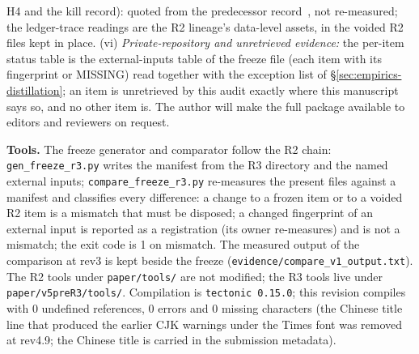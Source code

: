 \documentclass[11pt,a4paper]{article}
\newcommand{\thm}[1]{\nolinkurl{#1}}
\begin{document}
H4 and the kill record): quoted from the predecessor record~\cite{deposon2026}, not re-measured; the ledger-trace readings are the R2 lineage's data-level assets, in the voided R2 files kept in place. (vi) \emph{Private-repository and unretrieved evidence:} the per-item status table is the external-inputs table of the freeze file (each item with its fingerprint or MISSING) read together with the exception list of \S\ref{sec:empirics-distillation}; an item is unretrieved by this audit exactly where this manuscript says so, and no other item is. The author will make the full package available to editors and reviewers on request.

\textbf{Tools.} The freeze generator and comparator follow the R2 chain: \texttt{gen\_freeze\_r3.py} writes the manifest from the R3 directory and the named external inputs; \texttt{compare\_freeze\_r3.py} re-measures the present files against a manifest and classifies every difference: a change to a frozen item or to a voided R2 item is a mismatch that must be disposed; a changed fingerprint of an external input is reported as a registration (its owner re-measures) and is not a mismatch; the exit code is 1 on mismatch. The measured output of the comparison at rev3 is kept beside the freeze (\thm{evidence/compare_v1_output.txt}). The R2 tools under \thm{paper/tools/} are not modified; the R3 tools live under \thm{paper/v5preR3/tools/}. Compilation is \texttt{tectonic 0.15.0}; this revision compiles with 0 undefined references, 0 errors and 0 missing characters (the Chinese title line that produced the earlier CJK warnings under the Times font was removed at rev4.9; the Chinese title is carried in the submission metadata).
\end{document}
